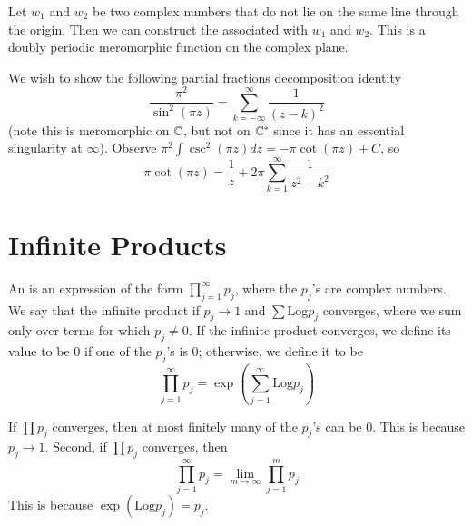 Let $w_1$ and $w_2$ be two complex numbers that do not lie on the same line through the origin. Then we can construct the  associated with $w_1$ and $w_2$. This is a doubly periodic meromorphic function on the complex plane.


\begin{example}
    We wish to show the following partial fractions decomposition identity \begin{equation*}
        \frac{\pi^2}{\sin^2(\pi z)} = \sum_{k=-\infty}^{\infty}\frac{1}{(z-k)^2}
    \end{equation*}
    (note this is meromorphic on $\mathbb C$, but not on $\mathbb C^*$ since it has an essential singularity at $\infty$). Observe $\pi^2\int\csc^2(\pi z)dz = -\pi\cot(\pi z)+C$, so \begin{equation*}
        \pi\cot(\pi z) = \frac{1}{z}+2\pi\sum_{k=1}^{\infty}\frac{1}{z^2-k^2}
    \end{equation*}
\end{example}



\section{Infinite Products}

\begin{definition}
    An  is an expression of the form $\prod_{j=1}^{\infty}p_j$, where the $p_j$'s are complex numbers. We say that the infinite product  if $p_j\rightarrow 1$ and $\sum\text{Log}p_j$ converges, where we sum only over terms for which $p_j\neq 0$. If the infinite product converges, we define its value to be $0$ if one of the $p_j$'s is $0$; otherwise, we define it to be \begin{equation*}
        \prod_{j=1}^{\infty}p_j = \exp\left(\sum_{j=1}^{\infty}\text{Log}p_j\right)
    \end{equation*}
\end{definition}

If $\prod p_j$ converges, then at most finitely many of the $p_j$'s can be $0$. This is because $p_j\rightarrow 1$. Second, if $\prod p_j$ converges, then \begin{equation*}
    \prod_{j=1}^{\infty}p_j = \lim\limits_{m\rightarrow \infty}\prod_{j=1}^mp_j
\end{equation*}
This is because $\exp(\text{Log}p_j) = p_j$.

